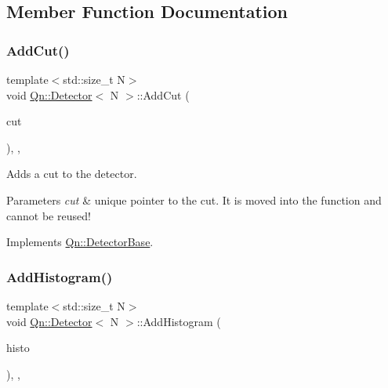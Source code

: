 \subsection{Member Function Documentation}
\mbox{\label{classQn_1_1Detector_a22b9795f3ae87d0b8ca483509907cbd1}} 
\subsubsection{\texorpdfstring{Add\+Cut()}{AddCut()}}
{\footnotesize\ttfamily template$<$std\+::size\+\_\+t N$>$ \\
void \mbox{\hyperlink{classQn_1_1Detector}{Qn\+::\+Detector}}$<$ N $>$\+::Add\+Cut (\begin{DoxyParamCaption}\item[{std\+::unique\+\_\+ptr$<$ \mbox{\hyperlink{structQn_1_1VariableCutBase}{Variable\+Cut\+Base}} $>$}]{cut }\end{DoxyParamCaption})\hspace{0.3cm}{\ttfamily [inline]}, {\ttfamily [override]}, {\ttfamily [virtual]}}



Adds a cut to the detector. 


\begin{DoxyParams}{Parameters}
{\em cut} & unique pointer to the cut. It is moved into the function and cannot be reused! \\
\hline
\end{DoxyParams}


Implements \mbox{\hyperlink{classQn_1_1DetectorBase}{Qn\+::\+Detector\+Base}}.

\mbox{\label{classQn_1_1Detector_a56d2dffc1f50b597edb95830f408b758}} 
\subsubsection{\texorpdfstring{Add\+Histogram()}{AddHistogram()}}
{\footnotesize\ttfamily template$<$std\+::size\+\_\+t N$>$ \\
void \mbox{\hyperlink{classQn_1_1Detector}{Qn\+::\+Detector}}$<$ N $>$\+::Add\+Histogram (\begin{DoxyParamCaption}\item[{std\+::unique\+\_\+ptr$<$ \mbox{\hyperlink{structQn_1_1QAHistoBase}{Q\+A\+Histo\+Base}} $>$}]{histo }\end{DoxyParamCaption})\hspace{0.3cm}{\ttfamily [inline]}, {\ttfamily [override]}, {\ttfamily [virtual]}}



